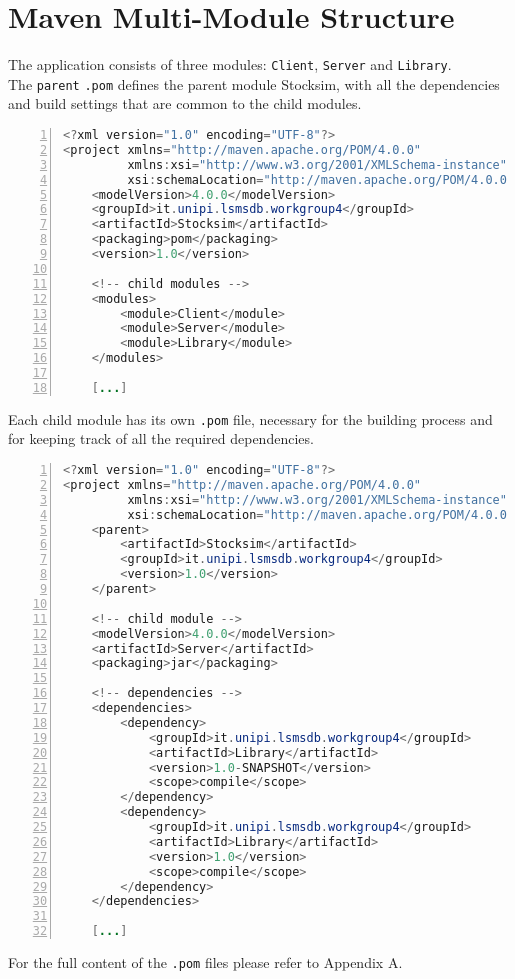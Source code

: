 \section{Maven Multi-Module Structure}
The application consists of three modules: \texttt{Client}, \texttt{Server} and
\texttt{Library}.\\
The \texttt{parent} \texttt{.pom} defines the parent module Stocksim, with all
the dependencies and build settings that are common to the child modules.\\
\begin{lstlisting}[basicstyle=\footnotesize,language=Java,numbers=left,
    numberstyle=\footnotesize,numbersep=4pt,frame=single]
<?xml version="1.0" encoding="UTF-8"?>
<project xmlns="http://maven.apache.org/POM/4.0.0"
         xmlns:xsi="http://www.w3.org/2001/XMLSchema-instance"
         xsi:schemaLocation="http://maven.apache.org/POM/4.0.0 http://maven.apache.org/xsd/maven-4.0.0.xsd">
    <modelVersion>4.0.0</modelVersion>
    <groupId>it.unipi.lsmsdb.workgroup4</groupId>
    <artifactId>Stocksim</artifactId>
    <packaging>pom</packaging>
    <version>1.0</version>

    <!-- child modules -->
    <modules>
        <module>Client</module>
        <module>Server</module>
        <module>Library</module>
    </modules>

    [...]
\end{lstlisting}
Each child module has its own \texttt{.pom} file, necessary for the building
process and for keeping track of all the required dependencies.\\
\begin{lstlisting}[basicstyle=\footnotesize,language=Java,numbers=left,
    numberstyle=\footnotesize,numbersep=4pt,frame=single]
<?xml version="1.0" encoding="UTF-8"?>
<project xmlns="http://maven.apache.org/POM/4.0.0"
         xmlns:xsi="http://www.w3.org/2001/XMLSchema-instance"
         xsi:schemaLocation="http://maven.apache.org/POM/4.0.0 http://maven.apache.org/xsd/maven-4.0.0.xsd">
    <parent>
        <artifactId>Stocksim</artifactId>
        <groupId>it.unipi.lsmsdb.workgroup4</groupId>
        <version>1.0</version>
    </parent>

    <!-- child module -->
    <modelVersion>4.0.0</modelVersion>
    <artifactId>Server</artifactId>
    <packaging>jar</packaging>

    <!-- dependencies -->
    <dependencies>
        <dependency>
            <groupId>it.unipi.lsmsdb.workgroup4</groupId>
            <artifactId>Library</artifactId>
            <version>1.0-SNAPSHOT</version>
            <scope>compile</scope>
        </dependency>
        <dependency>
            <groupId>it.unipi.lsmsdb.workgroup4</groupId>
            <artifactId>Library</artifactId>
            <version>1.0</version>
            <scope>compile</scope>
        </dependency>
    </dependencies>

    [...]
\end{lstlisting}
For the full content of the \texttt{.pom} files please refer to Appendix A.
